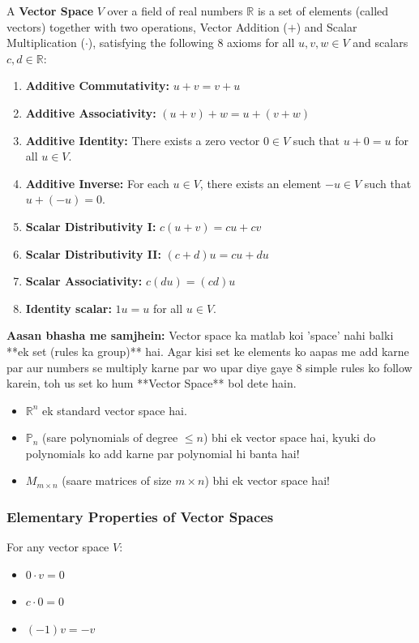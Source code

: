 \documentclass[11pt,a4paper]{article}
\begin{document}
\begin{definitionbox}
A \textbf{Vector Space} $V$ over a field of real numbers $\mathbb{R}$ is a set of elements (called vectors) together with two operations, Vector Addition ($+$) and Scalar Multiplication ($\cdot$), satisfying the following 8 axioms for all $u, v, w \in V$ and scalars $c, d \in \mathbb{R}$:
\begin{enumerate}
    \item \textbf{Additive Commutativity:} $u + v = v + u$
    \item \textbf{Additive Associativity:} $(u + v) + w = u + (v + w)$
    \item \textbf{Additive Identity:} There exists a zero vector $0 \in V$ such that $u + 0 = u$ for all $u \in V$.
    \item \textbf{Additive Inverse:} For each $u \in V$, there exists an element $-u \in V$ such that $u + (-u) = 0$.
    \item \textbf{Scalar Distributivity I:} $c(u + v) = cu + cv$
    \item \textbf{Scalar Distributivity II:} $(c + d)u = cu + du$
    \item \textbf{Scalar Associativity:} $c(du) = (cd)u$
    \item \textbf{Identity scalar:} $1u = u$ for all $u \in V$.
\end{enumerate}
\end{definitionbox}

\begin{hinglishbox}
\textbf{Aasan bhasha me samjhein:}
Vector space ka matlab koi 'space' nahi balki **ek set (rules ka group)** hai. Agar kisi set ke elements ko aapas me add karne par aur numbers se multiply karne par wo upar diye gaye 8 simple rules ko follow karein, toh us set ko hum **Vector Space** bol dete hain.
\begin{itemize}
    \item $\mathbb{R}^n$ ek standard vector space hai.
    \item $\mathbb{P}_n$ (sare polynomials of degree $\le n$) bhi ek vector space hai, kyuki do polynomials ko add karne par polynomial hi banta hai!
    \item $M_{m \times n}$ (saare matrices of size $m \times n$) bhi ek vector space hai!
\end{itemize}
\end{hinglishbox}

\subsubsection{Elementary Properties of Vector Spaces}
For any vector space $V$:
\begin{itemize}
    \item $0 \cdot v = 0$
    \item $c \cdot 0 = 0$
    \item $(-1)v = -v$
\end{itemize}
\end{document}
